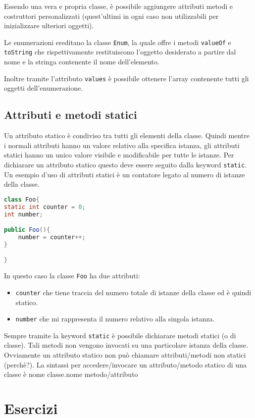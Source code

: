 \documentclass{article}
\begin{document}
Essendo una vera e propria classe, è possibile aggiungere
attributi metodi e
costruttori personalizzati (quest'ultimi in ogni caso non utilizzabili per inizializzare ulteriori oggetti).

Le enumerazioni ereditano la classe \texttt{Enum},
la quale offre i metodi \texttt{valueOf} e \texttt{toString}
che rispettivamente restituiscono l'oggetto desiderato
a partire dal nome e la stringa contenente il nome dell'elemento.

Inoltre tramite l'attributo \texttt{values} è possibile ottenere
l'array contenente tutti gli oggetti dell'enumerazione.

\subsection{Attributi e metodi statici}

Un attributo statico è condiviso tra tutti gli elementi della classe.
Quindi mentre i normali attributi hanno un valore relativo
alla specifica istanza, gli attributi statici hanno un unico
valore visibile e modificabile per tutte le istanze.
Per dichiarare un attributo statico questo deve essere seguito
dalla keyword \texttt{static}.
Un esempio d'uso di attributi statici
è un contatore legato al numero di istanze della classe. 
\begin{lstlisting}[language=Java,escapechar=|]
class Foo{
static int counter = 0;
int number;

public Foo(){
	number = counter++;
}

}
\end{lstlisting} 
In questo caso la classe \texttt{Foo} ha due attributi:
\begin{itemize}
	\item \texttt{counter} che tiene traccia del numero totale
		di istanze della classe ed è quindi statico.
	\item \texttt{number} che mi rappresenta il numero relativo 
		alla singola istanza.
\end{itemize}

Sempre tramite la keyword \texttt{static}
è possibile dichiarare metodi statici (o di classe).
Tali metodi non vengono invocati su una particolare
istanza della classe.
Ovviamente un attributo statico non può chiamare
attributi/metodi non statici (perchè?).
La sintassi per accedere/invocare un attributo/metodo statico
di una classe è
nome classe.nome metodo/attributo

\section{Esercizi}
\end{document}
